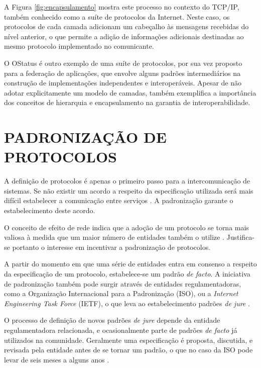 A Figura \ref{fig:encapsulamento} mostra este processo no contexto do TCP/IP, também
conhecido como a suíte de protocolos da Internet. Neste caso, os protocolos de cada
camada adicionam um cabeçalho às mensagens recebidas do nível anterior, o que
permite a adição de informações adicionais destinadas ao mesmo protocolo
implementado no comunicante.

O OStatus é outro exemplo de uma suíte de protocolos, por sua vez proposto para a
federação de aplicações, que envolve alguns padrões intermediários na construção de
implementações independentes e interoperáveis. Apesar de não adotar explicitamente
um modelo de camadas, também exemplifica a importância dos conceitos de hierarquia e
encapsulamento na garantia de interoperabilidade.



\section{PADRONIZAÇÃO DE PROTOCOLOS}

A definição de protocolos é apenas o primeiro passo para a intercomunicação de
sistemas. Se não existir um acordo a respeito da especificação utilizada será mais
difícil estabelecer a comunicação entre serviços \cite{kurose2012}. A padronização
garante o estabelecimento deste acordo.

O conceito de efeito de rede indica que a adoção de um protocolo se torna mais
valiosa à medida que um maior número de entidades também o utilize
\cite{liebowitz1998}. Justifica-se portanto o interesse em incentivar a padronização
de protocolos.

A partir do momento em que uma série de entidades entra em consenso a respeito da
especificação de um protocolo, estabelece-se um padrão \textit{de facto}. A
iniciativa de padronização também pode surgir através de entidades regulamentadoras,
como a Organização Internacional para a Padronização (ISO), ou a \textit{Internet
Engineering Task Force} (IETF), o que leva ao estabelecimento padrões \textit{de
jure} \cite{tanenbaum2010}.

O processo de definição de novos padrões \textit{de jure} depende da entidade
regulamentadora relacionada, e ocasionalmente parte de padrões \textit{de facto} já
utilizados na comunidade. Geralmente uma especificação é proposta, discutida, e
revisada pela entidade antes de se tornar um padrão, o que no caso da ISO pode levar
de seis meses a alguns anos \cite{tanenbaum2010}.

